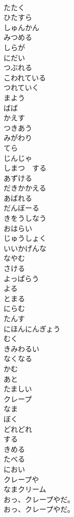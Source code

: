 \documentclass[8pt]{extreport}
\begin{document}
\begin{CJK}{UTF8}{min}
\\	たたく
\\	ひたすら
\\	しゅんかん
\\	みつめる
\\	しらが
\\	にだい
\\	つぶれる
\\	こわれている
\\	つれていく
\\	まよう
\\	ばば
\\	かえす
\\	つきあう
\\	みがわり
\\	てら
\\	じんじゃ
\\	しまつ　する
\\	あずける
\\	だきかかえる
\\	あばれる
\\	だんぼーる
\\	きをうしなう
\\	おはらい
\\	じゅうしょく
\\	いいかげんな
\\	なやむ
\\	さける
\\	よっぱらう
\\	よる
\\	とまる
\\	にらむ
\\	たんす
\\	にほんにんぎょう
\\	むく
\\	きみわるい
\\	なくなる
\\	かむ
\\	あと
\\	たましい
\\	クレープ
\\	なま
\\	ぼく
\\	どれどれ
\\	する
\\	きめる
\\	たべる
\\	におい
\\	クレープや
\\	なまクリーム
\\	おっ、クレープやだ。
\\	おっ、クレープやだ。

\end{CJK}
\end{document}

